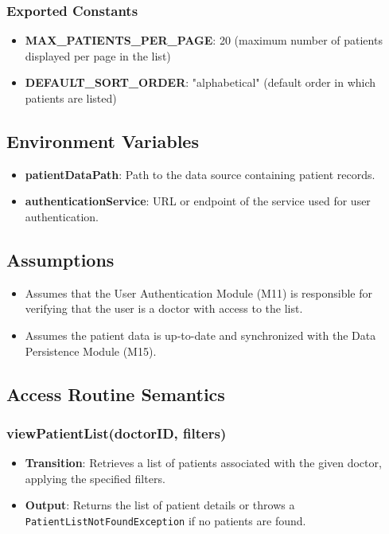 \documentclass[12pt, titlepage]{article}
\begin{document}
\subsubsection{Exported Constants}
\begin{itemize}
\item \textbf{MAX\_PATIENTS\_PER\_PAGE}: 20 (maximum number of patients displayed per page in the list)
\item \textbf{DEFAULT\_SORT\_ORDER}: "alphabetical" (default order in which patients are listed)
\end{itemize}

\subsection{Environment Variables}
\begin{itemize}
\item \textbf{patientDataPath}: Path to the data source containing patient records.
\item \textbf{authenticationService}: URL or endpoint of the service used for user authentication.
\end{itemize}

\subsection{Assumptions}
\begin{itemize}
\item Assumes that the User Authentication Module (M11) is responsible for verifying that the user is a doctor with access to the list.
\item Assumes the patient data is up-to-date and synchronized with the Data Persistence Module (M15).
\end{itemize}

\subsection{Access Routine Semantics}
\subsubsection{viewPatientList(doctorID, filters)}

\begin{itemize}
    \item \textbf{Transition}: Retrieves a list of patients associated with the given doctor, applying the specified filters.
    \item \textbf{Output}: Returns the list of patient details or throws a \texttt{PatientListNotFoundException} if no patients are found.
\end{itemize}
\end{document}
